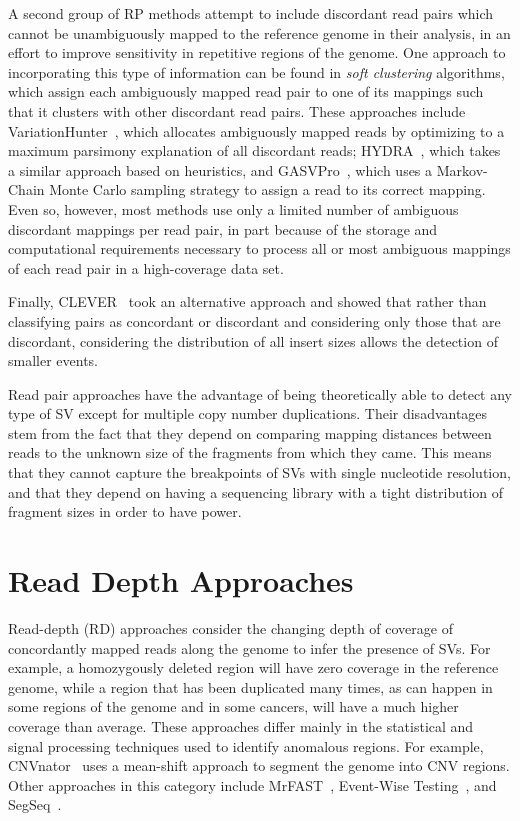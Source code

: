 A second group of RP methods attempt to include discordant read pairs which cannot be unambiguously mapped to the reference genome in their analysis, in an effort to improve sensitivity in repetitive regions of the genome. One approach to incorporating this type of information can be found in \emph{soft clustering} algorithms, which assign each ambiguously mapped read pair to one of its mappings such that it clusters with other discordant read pairs. These approaches include VariationHunter~\cite{Hormozdiari:2009p284}, which allocates ambiguously mapped reads by optimizing to a maximum parsimony explanation of all discordant reads; HYDRA~\cite{Quinlan:2010gf}, which takes a similar approach based on heuristics, and GASVPro~\cite{Sindi:2012kk}, which uses a Markov-Chain Monte Carlo sampling strategy to assign a read to its correct mapping. Even so, however, most methods use only a limited number of ambiguous discordant mappings per read pair, in part because of the storage and computational requirements necessary to process all or most ambiguous mappings of each read pair in a high-coverage data set.

Finally, CLEVER~\cite{Marschall:2012ek} took an alternative approach and showed that rather than classifying pairs as concordant or discordant and considering only those that are discordant, considering the distribution of all insert sizes allows the detection of smaller events. 

Read pair approaches have the advantage of being theoretically able to detect any type of SV except for multiple copy number duplications. Their disadvantages stem from the fact that they depend on comparing mapping distances between reads to the unknown size of the fragments from which they came. This means that they cannot capture the breakpoints of SVs with single nucleotide resolution, and that they depend on having a sequencing library with a tight distribution of fragment sizes in order to have power.

\section{Read Depth Approaches}

Read-depth (RD) approaches consider the changing depth of coverage of concordantly mapped reads along the genome to infer the presence of SVs. For example, a homozygously deleted region will have zero coverage in the reference genome, while a region that has been duplicated many times, as can happen in some regions of the genome and in some cancers, will have a much higher coverage than average. These approaches differ mainly in the statistical and signal processing techniques used to identify anomalous regions. For example, CNVnator~\cite{Abyzov:2011bk} uses a mean-shift approach to segment the genome into CNV regions. Other approaches in this category include MrFAST~\cite{Alkan:2009cr}, Event-Wise Testing~\cite{Yoon:2009kb}, and SegSeq~\cite{Chiang:2009di}.

